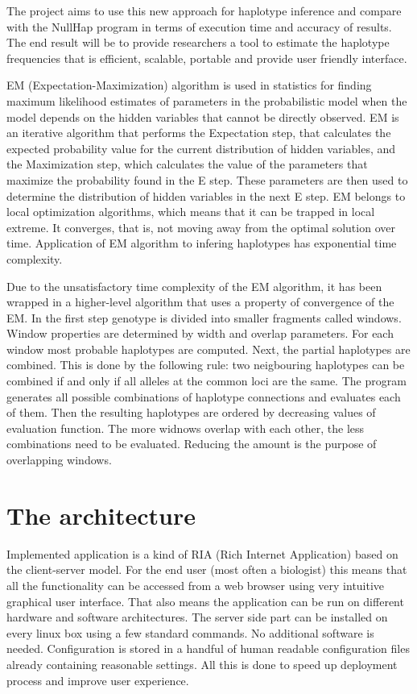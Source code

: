 \documentclass{llncs}
\begin{document}
The project aims to use this new approach for haplotype inference and compare with the NullHap program in terms of execution time and accuracy of results.
The end result will be to provide researchers a tool to estimate the haplotype frequencies that is efficient, scalable, portable and provide user friendly interface.

EM (Expectation-Maximization) algorithm  is used in statistics for finding maximum likelihood estimates of parameters in the probabilistic model when the model depends on the hidden variables that cannot be directly observed.
EM is an iterative algorithm that performs the Expectation step, that calculates the expected probability value for the current distribution of hidden variables, and the Maximization step, which calculates the value of the parameters that maximize the probability found in the E step.
These parameters are then used to determine the distribution of hidden variables in the next E step.
EM belongs to local optimization algorithms, which means that it can be trapped in local extreme.
It converges, that is, not moving away from the optimal solution over time.
Application of EM algorithm to infering haplotypes has exponential time complexity.

Due to the unsatisfactory time complexity of the EM algorithm, it has been wrapped in a higher-level algorithm that uses a property of convergence of the EM.
In the first step genotype is divided into smaller fragments called windows.
Window properties are determined by width and overlap parameters.
For each window most probable haplotypes are computed.
Next, the partial haplotypes are combined.
This is done by the following rule: two neigbouring haplotypes can be combined if and only if all alleles at the common loci are the same.
The program generates all possible combinations of haplotype connections and evaluates each of them.
Then the resulting haplotypes are ordered by decreasing values of evaluation function.
The more widnows overlap with each other, the less combinations need to be evaluated.
Reducing the amount is the purpose of overlapping windows.

\section{The architecture}

Implemented application is a kind of RIA (Rich Internet Application) based on the client-server model. 
For the end user (most often a biologist) this means that all the functionality can be accessed from a web browser using very intuitive graphical user interface. 
That also means the application can be run on different hardware and software architectures. 
The server side part can be installed on every linux box using a few standard commands. 
No additional software is needed. 
Configuration is stored in a handful of human readable configuration files already containing reasonable settings. 
All this is done to speed up deployment process and improve user experience.
\end{document}
